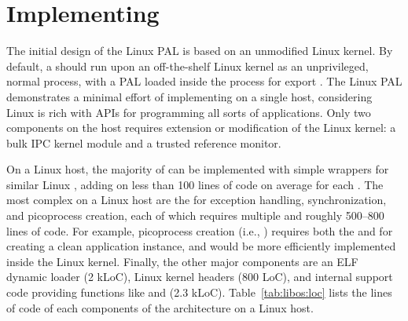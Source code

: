 \section{Implementing \thehostabi{}}
\label{sec:linux:impl}

The initial design of the Linux PAL is based on an unmodified Linux kernel.
By default, a \graphene{} \picoproc{} should run upon
an off-the-shelf Linux kernel as an unprivileged, normal process, with a PAL loaded inside the process for export \thehostabi{}.
The Linux PAL demonstrates a minimal effort of implementing \thehostabi{}
on a single host, considering Linux is rich with APIs for programming all sorts of applications.
Only two \graphene{} components on the host requires extension or modification of the Linux kernel: a bulk IPC kernel module and a trusted reference monitor.



On a Linux host,
the majority of \hostapis{} can be implemented with simple wrappers
for similar Linux \linuxapis{},
adding on less than 100 lines of code on average for each \hostapi{}.
The most complex \hostapis{} on a Linux host are the \hostapis{} for exception handling, synchronization, and picoprocess
creation, each of which requires multiple \linuxapis{} and roughly 500--800 lines of code.
For example, picoprocess creation (i.e., ) requires 
both the  and  \linuxapis{}
for creating a clean
application instance, and would be more efficiently
implemented inside the Linux kernel.
Finally, the other major \pal{} components are an ELF dynamic loader (2 kLoC),
Linux kernel headers (800 LoC),
and internal support code providing functions like  and  (2.3 kLoC).
Table~\ref{tab:libos:loc} lists the lines of code of each components of the \graphene{} architecture on a Linux host.


